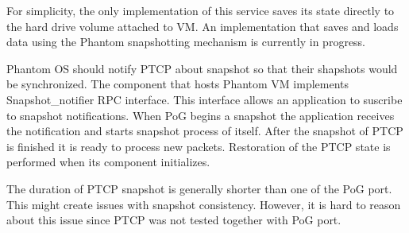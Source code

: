 For simplicity, the only implementation of this service saves its state
directly to the hard drive volume attached to VM. An implementation that saves
and loads data using the Phantom snapshotting mechanism is currently in
progress.

Phantom OS should notify PTCP about snapshot so that their shapshots would be
synchronized. The component that hosts Phantom VM implements Snapshot\_notifier
RPC interface. This interface allows an application to suscribe to snapshot
notifications. When PoG begins a snapshot the application receives the
notification and starts snapshot process of itself. After the snapshot of PTCP
is finished it is ready to process new packets. Restoration of the PTCP state
is performed when its component initializes.

The duration of PTCP snapshot is generally shorter than one of the PoG port.
This might create issues with snapshot consistency. However, it is hard to
reason about this issue since PTCP was not tested together with PoG port.
